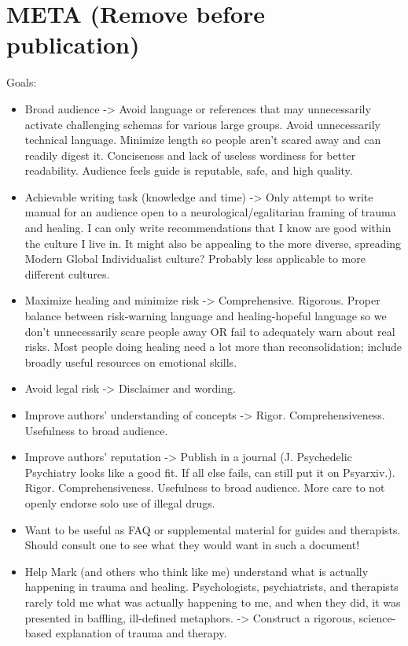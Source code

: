 \documentclass[12pt,letterpaper]{article}
\begin{document}
\section*{META (Remove before publication)}
Goals:
\begin{itemize}
    \item Broad audience -> Avoid language or references that may unnecessarily activate challenging schemas for various large groups. Avoid unnecessarily technical language. Minimize length so people aren't scared away and can readily digest it. Conciseness and lack of useless wordiness for better readability. Audience feels guide is reputable, safe, and high quality.
    \item Achievable writing task (knowledge and time) -> Only attempt to write manual for an audience open to a neurological/egalitarian framing of trauma and healing. I can only write recommendations that I know are good within the culture I live in. It might also be appealing to the more diverse, spreading Modern Global Individualist culture? Probably less applicable to more different cultures.
    \item Maximize healing and minimize risk -> Comprehensive. Rigorous. Proper balance between risk-warning language and healing-hopeful language so we don't unnecessarily scare people away OR fail to adequately warn about real risks. Most people doing healing need a lot more than reconsolidation; include broadly useful resources on emotional skills.
    \item Avoid legal risk -> Disclaimer and wording.
    \item Improve authors' understanding of concepts -> Rigor. Comprehensiveness. Usefulness to broad audience.
    \item Improve authors' reputation -> Publish in a journal (J. Psychedelic Psychiatry looks like a good fit. If all else fails, can still put it on Psyarxiv.). Rigor. Comprehensiveness. Usefulness to broad audience. More care to not openly endorse solo use of illegal drugs.
    \item Want to be useful as FAQ or supplemental material for guides and therapists. Should consult one to see what they would want in such a document!
    \item Help Mark (and others who think like me) understand what is actually happening in trauma and healing. Psychologists, psychiatrists, and therapists rarely told me what was actually happening to me, and when they did, it was presented in baffling, ill-defined metaphors. -> Construct a rigorous, science-based explanation of trauma and therapy.
\end{itemize}
\end{document}
